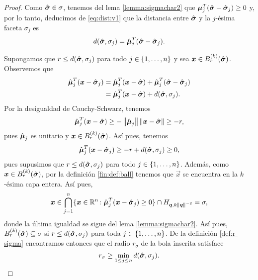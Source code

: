 \begin{proof}
	Como $\hat{\boldsymbol{ \sigma }} \in \sigma$, tenemos del lema \ref{lemma:sigmachar2} que
	$\boldsymbol{\mu}_j^T(\hat{\boldsymbol{ \sigma }} - \hat{\boldsymbol{ \sigma }}_j) \geq 0$ y, por lo tanto, deducimos de \eqref{eq:dist:v1}
	que la distancia entre $\hat{\boldsymbol{ \sigma }}$ y la $j$-ésima faceta $\sigma_j$ es
	\begin{equation}
		\label{eq:dist}
		d(\hat{\boldsymbol{ \sigma }}, \sigma_j) = \hat{\boldsymbol{\mu}}_j^T(\hat{\boldsymbol{ \sigma }} - \hat{\boldsymbol{ \sigma }}_j).
	\end{equation}

	Supongamos que $r \leq d(\hat{\boldsymbol{ \sigma }}, \sigma_j)$ para todo $j \in \lbrace 1, \ldots, n \rbrace$ y sea
	$\boldsymbol{x} \in B_r^{(k)}(\hat{\boldsymbol{ \sigma }})$. Observemos que
	\begin{align*}
		\hat{\boldsymbol{\mu}}_j^T(\boldsymbol{x} - \hat{\boldsymbol{ \sigma }}_j)
		&= 
		\hat{\boldsymbol{\mu}}_j^T(\boldsymbol{x} - \hat{\boldsymbol{ \sigma }})
		+
		\hat{\boldsymbol{\mu}}_j^T(\hat{\boldsymbol{ \sigma }} - \hat{\boldsymbol{ \sigma }}_j) \\
		&=
		\hat{\boldsymbol{\mu}}_j^T(\boldsymbol{x} - \hat{\boldsymbol{ \sigma }}) + d(\hat{\boldsymbol{ \sigma }}, \sigma_j).
	\end{align*}
	Por la desigualdad de Cauchy-Schwarz, tenemos
	\begin{equation*}
		\hat{\boldsymbol{\mu}}_j^T(\boldsymbol{x} - \hat{\boldsymbol{ \sigma }}) \geq -\left\lVert \hat{\boldsymbol{\mu}}_j \right\rVert\left\lVert \boldsymbol{x} -
		\hat{\boldsymbol{ \sigma }} \right\rVert \geq -r,
	\end{equation*}
	pues $\hat{\boldsymbol{\mu}}_j$ es unitario y $\boldsymbol{x} \in B_r^{(k)}(\hat{\boldsymbol{ \sigma }})$. Así pues, tenemos
	\begin{equation*}
		\hat{\boldsymbol{\mu}}_j^T(\boldsymbol{x} - \hat{\boldsymbol{ \sigma }}_j) \geq -r + d(\hat{\boldsymbol{ \sigma }}, \sigma_j) \geq 0,
	\end{equation*}
	pues supusimos que $r \leq d(\hat{\boldsymbol{ \sigma }}, \sigma_j)$ para todo $j \in \lbrace 1, \ldots, n \rbrace$.
	Además, como $\boldsymbol{x} \in B_r^{(k)}(\hat{\boldsymbol{ \sigma }})$, por la definición \ref{fin:def:ball} tenemos
	que $\vec{x}$ se encuentra en la $k$-ésima capa entera. Así pues,
	\begin{equation*}
		\boldsymbol{x} \in
		\bigcap_{j=1}^{n}
		\lbrace \boldsymbol{x} \in \mathbb{R}^n \colon \hat{\boldsymbol{\mu}}_j^T(\boldsymbol{x} - \hat{\boldsymbol{ \sigma }}_j) \geq 0 \rbrace
		\cap H_{\boldsymbol{q}, k\left\lVert \boldsymbol{q} \right\rVert^{-2}} = \sigma,
	\end{equation*}
	donde la última igualdad se sigue del lema \ref{lemma:sigmachar2}. Así pues,
	$B_r^{(k)}(\hat{\boldsymbol{ \sigma }}) \subseteq \sigma$ si $r \leq d(\hat{\boldsymbol{ \sigma }}, \sigma_j)$ para toda $j
	\in \lbrace 1, \ldots, n \rbrace$. De la definición \ref{def:r-sigma} encontramos entonces que el radio
	$r_\sigma$ de la bola inscrita satisface
	\begin{equation}
		\label{r-sigma:down}
		r_\sigma \geq \min_{1 \leq j \leq n}d(\hat{\boldsymbol{ \sigma }}, \sigma_j).
	\end{equation}


\end{proof}
